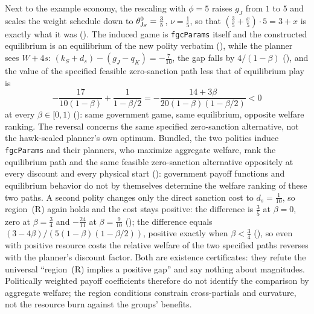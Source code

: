 Next to the example economy, the rescaling with $\phi=5$ raises $g_J$ from $1$
to $5$ and scales the weight schedule down to $\theta^0_{\mathsf{J}_S}=\tfrac35$,
$\nu=\tfrac15$, so that $(\tfrac35+\tfrac x5)\cdot5=3+x$ is exactly what it was
(). The induced game is
\texttt{fgcParams} itself and the constructed equilibrium is an equilibrium of
the new polity verbatim (), while the
planner sees $W+4s$: $(k_S+d_s)-(g_J-q_K)=-\tfrac7{10}$, the gap falls by
$4/(1-\beta)$ (), and the value of the
specified feasible zero-sanction path less that of equilibrium play is
\[
-\frac{17}{10(1-\beta)}+\frac{1}{1-\beta/2}
=-\frac{14+3\beta}{20(1-\beta)(1-\beta/2)}<0
\]
at every $\beta\in[0,1)$ (): same
government game, same equilibrium, opposite welfare ranking. The reversal
concerns the same specified zero-sanction alternative, not the hawk-scaled
planner's own optimum. Bundled, the two polities induce \texttt{fgcParams}
and their planners, who maximize aggregate welfare, rank the equilibrium path and the same
feasible zero-sanction alternative oppositely at every discount and every
physical start
(): government payoff
functions and equilibrium behavior do not by themselves determine the
welfare ranking of these two paths. A second polity
changes only the direct sanction cost to $d_s=\tfrac1{10}$, so region~(R)
again holds and the cost stays positive: the difference is $\tfrac35$ at
$\beta=0$, zero at $\beta=\tfrac34$ and $-\tfrac{24}{11}$ at
$\beta=\tfrac9{10}$ ();
the difference equals $(3-4\beta)/(5(1-\beta)(1-\beta/2))$, positive exactly
when $\beta<\tfrac34$ (), so
even with positive resource costs the relative welfare of the two specified
paths reverses with the planner's discount factor. Both are existence
certificates: they refute the universal ``region~(R) implies a
positive gap'' and say nothing about magnitudes. Politically weighted payoff
coefficients therefore do not identify the comparison by aggregate welfare;
the region conditions constrain cross-partials and curvature, not the
resource burn against the groups' benefits.

